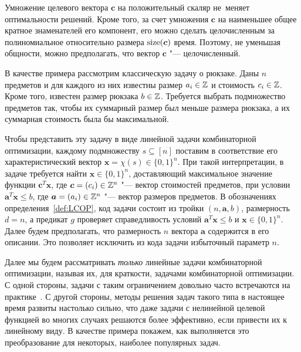 \begin{remark}
Умножение целевого вектора $\bm{c}$ на положительный скаляр не~меняет оптимальности решений. 
Кроме того, за счет умножения $\bm{c}$ на наименьшее общее кратное знаменателей его компонент, его можно сделать целочисленным за полиномиальное относительно размера $\operatorname{size}(\bm{c})$ время.
Поэтому, не уменьшая общности, можно предполагать, что вектор $\bm{c}$ "--- целочисленный.
\end{remark}


В качестве примера рассмотрим классическую задачу о рюкзаке. 
Даны $n$ предметов и для каждого из них известны размер $a_i \in \mathbb{Z}$ и стоимость $c_i \in \mathbb{Z}$. Кроме того, известен размер рюкзака $b \in \mathbb{Z}$.
Требуется выбрать подмножество предметов так, чтобы их суммарный размер был меньше размера рюкзака, а их суммарная стоимость была бы максимальной.

Чтобы представить эту задачу в виде линейной задачи комбинаторной оптимизации, каждому подмножеству $s \subseteq [n]$ поставим в соответствие его характеристический вектор $\bm{x} = \chi(s) \in \{0,1\}^n$. При такой интерпретации, в задаче требуется найти $\bm{x} \in \{0,1\}^n$, доставляющий максимальное значение функции $\bm{c}^T \bm{x}$, где $\bm{c} = (c_i) \in \mathbb{Z}^n$ "--- вектор стоимостей предметов, при условии $\bm{a}^T \bm{x} \le b$, где $\bm{a} = (a_i) \in \mathbb{Z}^n$ "--- вектор размеров предметов.
В обозначениях определения~\ref{def:LCOP}, код задачи состоит из тройки $(n, \bm{a}, b)$, размерность $d = n$, а предикат $g$ проверяет справедливость условий $\bm{a}^T \bm{x} \le b$ и $\bm{x} \in \{0,1\}^n$. Далее будем предполагать, что размерность $n$ вектора $\bm{a}$ содержится в его описании. Это позволяет исключить из кода задачи избыточный параметр $n$.


Далее мы будем рассматривать \emph{только} линейные задачи комбинаторной оптимизации, называя их, для краткости, задачами комбинаторной оптимизации.
С одной стороны, задачи с таким ограничением довольно часто встречаются на практике~\cite{Junger:1995}.
С другой стороны, методы решения задач такого типа в настоящее время развиты настолько сильно, что даже задачи с нелинейной целевой функцией во многих случаях решаются более эффективно, если привести их к линейному виду.
В качестве примера покажем, как выполняется это преобразование для некоторых, наиболее популярных задач.

